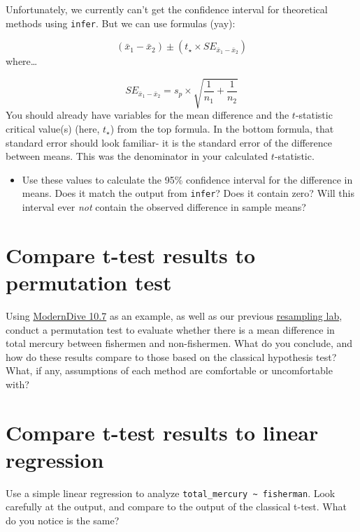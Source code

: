 \documentclass[]{article}
\providecommand{\tightlist}{%
  \setlength{\itemsep}{0pt}\setlength{\parskip}{0pt}}
\begin{document}
Unfortunately, we currently can't get the confidence interval for
theoretical methods using \texttt{infer}. But we can use formulas (yay):

\[ ({\bar {x}}_{1}-{\bar {x}}_{2}) \pm (t_{\star} \times SE_{{\bar {x}}_{1}-{\bar {x}}_{2}})\]
where\ldots{}

\[SE_{{\bar {x}}_{1}-{\bar {x}}_{2}} = s_{p} \times \sqrt {{\frac {1}{n_{1}}}+{\frac {1}{n_{2}}}}\]
You should already have variables for the mean difference and the
\(t\)-statistic critical value(s) (here, \(t_{\star}\)) from the top
formula. In the bottom formula, that standard error should look
familiar- it is the standard error of the difference between means. This
was the denominator in your calculated \(t\)-statistic.

\begin{itemize}
\tightlist
\item
  Use these values to calculate the 95\% confidence interval for the
  difference in means. Does it match the output from \texttt{infer}?
  Does it contain zero? Will this interval ever \emph{not} contain the
  observed difference in sample means?
\end{itemize}

\section{Compare t-test results to permutation
test}\label{compare-t-test-results-to-permutation-test}

Using
\href{http://moderndive.netlify.com/10-hypothesis-testing.html\#example-comparing-two-means}{ModernDive
10.7} as an example, as well as our previous
\href{https://apreshill.github.io/ohsu-basic-stats/cm034.html}{resampling
lab}, conduct a permutation test to evaluate whether there is a mean
difference in total mercury between fishermen and non-fishermen. What do
you conclude, and how do these results compare to those based on the
classical hypothesis test? What, if any, assumptions of each method are
comfortable or uncomfortable with?

\section{Compare t-test results to linear
regression}\label{compare-t-test-results-to-linear-regression}

Use a simple linear regression to analyze
\texttt{total\_mercury\ \textasciitilde{}\ fisherman}. Look carefully at
the output, and compare to the output of the classical t-test. What do
you notice is the same?
\end{document}
